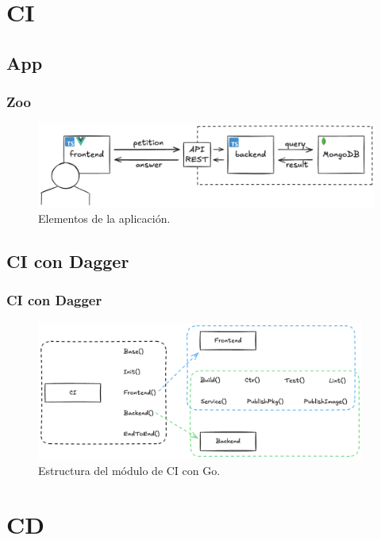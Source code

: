 \documentclass{beamer}
\begin{document}
\section{CI}
\subsection{App}
\begin{frame}
    \frametitle{Zoo}
    \begin{figure}
        \includegraphics[scale=0.25]{figuras/app}
        \caption{Elementos de la aplicación.}
    \end{figure}
\end{frame}

\subsection{CI con Dagger}
\begin{frame}
    \frametitle{CI con Dagger}
    \begin{figure}
        \includegraphics[width=10.8cm]{figuras/ci_dagger_go}
        \caption{Estructura del módulo de CI con Go.}
    \end{figure}
\end{frame}

\section{CD}
\end{document}
